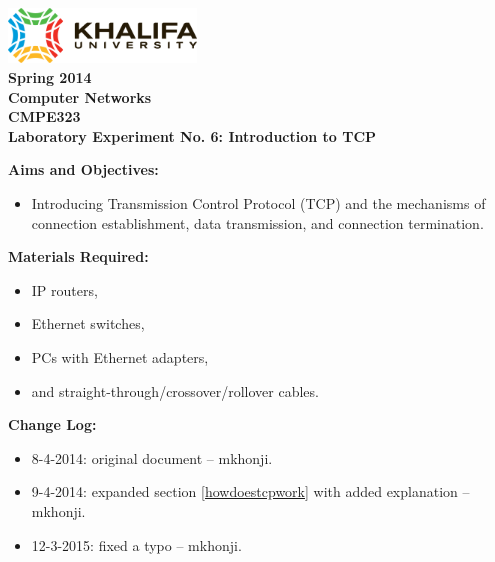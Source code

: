 \documentclass[pdftex,12pt,a4paper]{article}
\begin{document}
    \begin{titlepage}
        \begin{center}
            \includegraphics[width=5cm]{figures/kulogo}\\[1cm]
            {\Large \bfseries
                Spring 2014\\
                Computer Networks\\
                CMPE323\\[1cm]
            }
            {\large \bfseries
                \noindent Laboratory Experiment No. 6: Introduction to TCP\\[1cm]
            }
        \end{center}

        \noindent \textbf{Aims and Objectives:}
            \begin{itemize}[leftmargin=4cm]
                \item Introducing Transmission Control Protocol (TCP) and the
                    mechanisms of connection establishment, data transmission,
                    and connection termination.
            \end{itemize}
            \vspace{0.5cm}

        \noindent \textbf{Materials Required:}
            \begin{itemize}[leftmargin=4cm]
                \item IP routers,
                \item Ethernet switches,
                \item PCs with Ethernet adapters,
                \item and straight-through/crossover/rollover cables.
            \end{itemize}
            \vspace{0.5cm}

        \noindent \textbf{Change Log:}
            \begin{itemize}[leftmargin=4cm]
                \item 8-4-2014: original document -- mkhonji.
                \item 9-4-2014: expanded section \ref{howdoestcpwork} with
                    added explanation --
                    mkhonji.
                \item 12-3-2015: fixed a typo -- mkhonji.
            \end{itemize}
    \end{titlepage}
    \newpage
\end{document}
